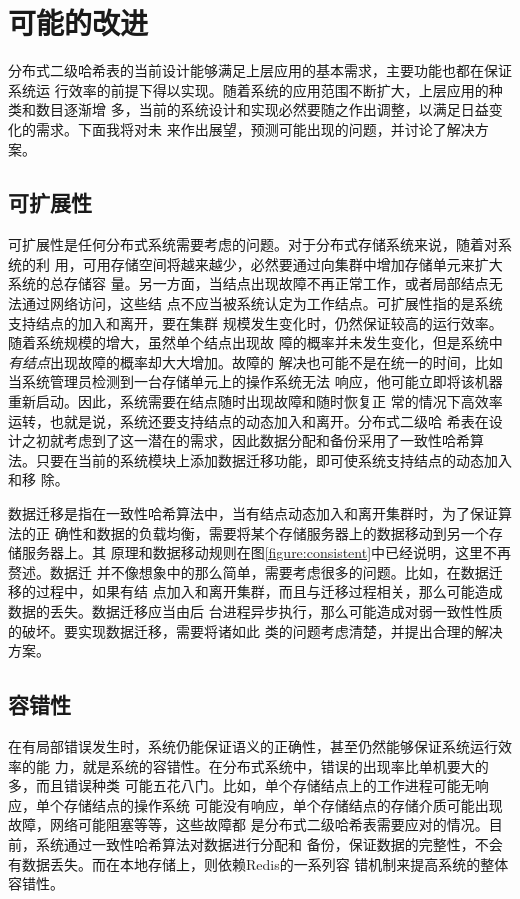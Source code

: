 \chapter{可能的改进}\label{chapter:future}
分布式二级哈希表的当前设计能够满足上层应用的基本需求，主要功能也都在保证系统运
行效率的前提下得以实现。随着系统的应用范围不断扩大，上层应用的种类和数目逐渐增
多，当前的系统设计和实现必然要随之作出调整，以满足日益变化的需求。下面我将对未
来作出展望，预测可能出现的问题，并讨论了解决方案。

\section{可扩展性}
可扩展性是任何分布式系统需要考虑的问题。对于分布式存储系统来说，随着对系统的利
用，可用存储空间将越来越少，必然要通过向集群中增加存储单元来扩大系统的总存储容
量。另一方面，当结点出现故障不再正常工作，或者局部结点无法通过网络访问，这些结
点不应当被系统认定为工作结点。可扩展性指的是系统支持结点的加入和离开，要在集群
规模发生变化时，仍然保证较高的运行效率。随着系统规模的增大，虽然单个结点出现故
障的概率并未发生变化，但是系统中\emph{有结点}出现故障的概率却大大增加。故障的
解决也可能不是在统一的时间，比如当系统管理员检测到一台存储单元上的操作系统无法
响应，他可能立即将该机器重新启动。因此，系统需要在结点随时出现故障和随时恢复正
常的情况下高效率运转，也就是说，系统还要支持结点的动态加入和离开。分布式二级哈
希表在设计之初就考虑到了这一潜在的需求，因此数据分配和备份采用了一致性哈希算
法。只要在当前的系统模块上添加数据迁移功能，即可使系统支持结点的动态加入和移
除。

数据迁移是指在一致性哈希算法中，当有结点动态加入和离开集群时，为了保证算法的正
确性和数据的负载均衡，需要将某个存储服务器上的数据移动到另一个存储服务器上。其
原理和数据移动规则在图\ref{figure:consistent}中已经说明，这里不再赘述。数据迁
并不像想象中的那么简单，需要考虑很多的问题。比如，在数据迁移的过程中，如果有结
点加入和离开集群，而且与迁移过程相关，那么可能造成数据的丢失。数据迁移应当由后
台进程异步执行，那么可能造成对弱一致性性质的破坏。要实现数据迁移，需要将诸如此
类的问题考虑清楚，并提出合理的解决方案。

\section{容错性}
在有局部错误发生时，系统仍能保证语义的正确性，甚至仍然能够保证系统运行效率的能
力，就是系统的容错性。在分布式系统中，错误的出现率比单机要大的多，而且错误种类
可能五花八门。比如，单个存储结点上的工作进程可能无响应，单个存储结点的操作系统
可能没有响应，单个存储结点的存储介质可能出现故障，网络可能阻塞等等，这些故障都
是分布式二级哈希表需要应对的情况。目前，系统通过一致性哈希算法对数据进行分配和
备份，保证数据的完整性，不会有数据丢失。而在本地存储上，则依赖Redis的一系列容
错机制来提高系统的整体容错性。

